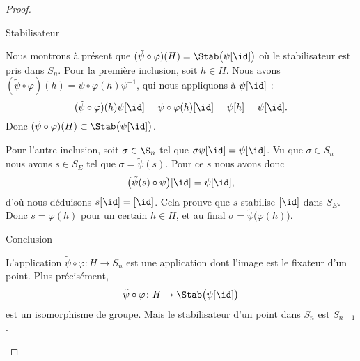 \begin{proof}
\begin{subproof}
\begin{subproof}
                \item[Stabilisateur]

                    Nous montrons à présent que \( (\tilde \psi\circ\varphi)(H)=\Stab\big( \psi[\id] \big)\) où le stabilisateur est pris dans \( S_n\). Pour la première inclusion, soit \( h\in H\). Nous avons \( (\tilde \psi\circ\varphi)(h)=\psi\circ\varphi(h)\psi^{-1}\), qui nous appliquons à \( \psi[\id]\) :
                    \begin{equation}
                        (\tilde \psi\circ\varphi)(h)\psi[\id]=\psi\circ\varphi(h)[\id]=\psi[h]=\psi[\id].
                    \end{equation}
                    Donc \( (\tilde \psi\circ\varphi)(H)\subset\Stab\big( \psi[\id] \big)\).

                    Pour l'autre inclusion, soit \( \sigma\in\S_n\) tel que \( \sigma\psi[\id]=\psi[\id]\). Vu que \( \sigma\in S_n\) nous avons \( s\in S_E\) tel que \( \sigma=\tilde \psi(s)\). Pour ce \( s\) nous avons donc
                    \begin{equation}
                        \big( \tilde \psi(s)\circ\psi \big)[\id]=\psi[\id],
                    \end{equation}
                    d'où nous déduisons \( s[\id]=[\id]\). Cela prouve que \( s\) stabilise \( [\id]\) dans \( S_E\). Donc \( s=\varphi(h)\) pour un certain \( h\in H\), et au final \( \sigma=\tilde \psi\big( \varphi(h) \big)\).

                \item[Conclusion]

                    L'application \( \tilde \psi\circ\varphi\colon H\to S_n\) est une application dont l'image est le fixateur d'un point. Plus précisément,
                    \begin{equation}
                        \tilde \psi\circ\varphi\colon H\to \Stab\big( \psi[\id] \big)
                    \end{equation}
                    est un isomorphisme de groupe. Mais le stabilisateur d'un point dans \( S_n\) est \( S_{n-1}\).

            \end{subproof}

    \end{subproof}
\end{proof}
